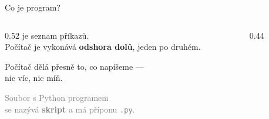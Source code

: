 \begin{frame}{Co je program?}
  \begin{columns}[T]
    \begin{column}{0.52\textwidth}
       je seznam příkazů.\\
      Počítač je vykonává \textbf{odshora dolů}, jeden po druhém.

      \bigskip
      Počítač dělá přesně to, co napíšeme —\\
      nic víc, nic míň.

      \bigskip
      \textcolor{gray}{\small
        Soubor s Python programem\\
        se nazývá \textbf{skript} a má příponu \texttt{.py}.
      }
    \end{column}
    \begin{column}{0.44\textwidth}
      \centering
    \end{column}
  \end{columns}
\end{frame}

